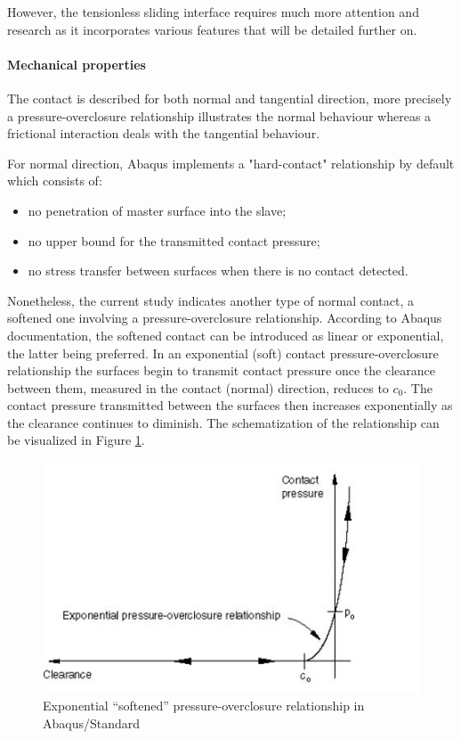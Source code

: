 However, the tensionless sliding interface requires much more attention and research as it incorporates various features that will be detailed further on.
 
\paragraph{Mechanical properties}   
The contact is described for both normal and tangential direction, more precisely a pressure-overclosure relationship illustrates the normal behaviour whereas a frictional interaction deals with the tangential behaviour. 

For normal direction, Abaqus implements a "hard-contact" relationship by default which consists of:
\begin{itemize}
	\item no penetration of master surface into the slave;
	\item no upper bound for the transmitted contact pressure;
	\item no stress transfer between surfaces when there is no contact detected.
\end{itemize}

Nonetheless, the current study indicates another type of normal contact, a softened one involving a pressure-overclosure relationship. According to Abaqus documentation, the softened contact can be introduced as linear or exponential, the latter being preferred. In an exponential (soft) contact pressure-overclosure relationship the surfaces begin to transmit contact pressure once the clearance between them, measured in the contact (normal) direction, reduces to $c_0$. The contact pressure transmitted between the surfaces then increases exponentially as the clearance continues to diminish. The schematization of the relationship can be visualized in Figure \ref{pressure}.
\begin{figure}[!h]
	\centering
	\includegraphics[width=0.45 \linewidth]{"pressure"}
	\caption{Exponential “softened” pressure-overclosure relationship in Abaqus/Standard}
	\label{pressure}
\end{figure} 

